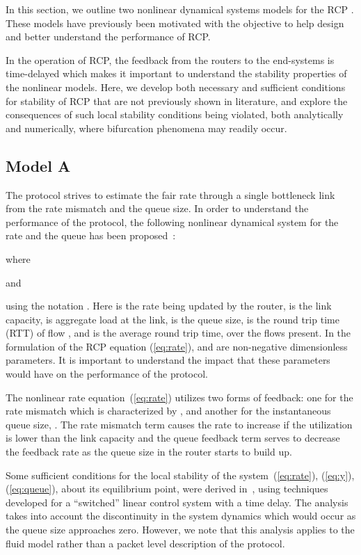 \documentclass[conference]{IEEEtran}
\begin{document}
In this section, we outline two nonlinear dynamical systems models for the RCP \cite{nanswitch, krv}. These models have previously been motivated with the objective to 
help design and better understand the performance of RCP.

In the operation of RCP, the feedback from the routers to the end-systems is time-delayed which makes 
it important to understand the stability properties of the nonlinear models. 
Here, we develop both necessary and sufficient conditions for stability of RCP that are not previously shown in literature, and explore the 
consequences of such local stability conditions being violated, both analytically and numerically,
where bifurcation phenomena may readily occur.

\subsection{Model A}

The protocol strives to estimate the fair rate through a single bottleneck link from the rate mismatch 
and the queue size. In order to understand the performance of the protocol, the following nonlinear 
dynamical system for the rate and the queue has been proposed~\cite{nanswitch, FCT}:


where

and

using the notation .
Here  is the rate being updated by the router,
 is the link capacity,
 is aggregate load at the link,
 is the queue size,
 is the round trip time (RTT) of flow ,
and  is the average round trip time,
over the flows present. In the formulation of the RCP equation (\ref{eq:rate}),  and  are non-negative dimensionless parameters. It is important to understand the impact that these parameters would have on the performance of the protocol.  

The nonlinear rate equation~(\ref{eq:rate}) utilizes two
forms of feedback: one for the rate mismatch which is characterized by
, and another for the instantaneous queue size, . 
The rate mismatch term causes the rate to increase if the utilization is lower than the 
link capacity  and the queue feedback term serves to decrease the feedback rate as the 
queue size in the router starts to build up.     

Some sufficient conditions for the local stability of the
system~(\ref{eq:rate}), (\ref{eq:y}), (\ref{eq:queue}),
about its equilibrium point, were derived in~\cite{nanswitch},
using techniques developed for a ``switched'' linear control system
with a time delay. The analysis takes into account the discontinuity in the 
system dynamics which would occur as the queue size approaches zero. 
However, we note that this analysis applies to the fluid model rather than a packet level description of the protocol.  
\end{document}
